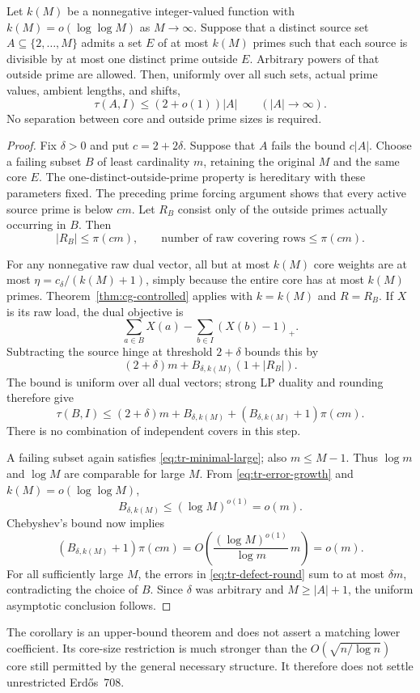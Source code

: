 \begin{corollary}
\label{cor:tr-small-core}
Let $k(M)$ be a nonnegative integer-valued function with
$k(M)=o(\log\log M)$ as $M\to\infty$. Suppose that a distinct source
set $A\subseteq\{2,\ldots,M\}$ admits a set $E$ of at most $k(M)$
primes such that each source is divisible by at most one distinct prime
outside $E$. Arbitrary powers of that outside prime are allowed.
Then, uniformly over all such sets, actual prime values, ambient lengths,
and shifts,
\[
 \tau(A,I)\le(2+o(1))|A|\qquad(|A|\to\infty).
\]
No separation between core and outside prime sizes is required.
\end{corollary}

\begin{proof}
Fix $\delta>0$ and put $c=2+2\delta$. Suppose that $A$ fails the bound
$c|A|$. Choose a failing subset $B$ of least cardinality $m$, retaining
the original $M$ and the same core $E$. The one-distinct-outside-prime
property is hereditary with these parameters fixed. The preceding prime
forcing argument shows that every active source prime is below $cm$.
Let $R_B$ consist only of the outside primes actually occurring in $B$.
Then
\begin{equation}
 |R_B|\le\pi(cm),
 \qquad\text{number of raw covering rows}\le\pi(cm).
 \label{eq:tr-active-counts}
\end{equation}

For any nonnegative raw dual vector, all but at most $k(M)$ core weights
are at most $\eta=c_\delta/(k(M)+1)$, simply because the entire core has
at most $k(M)$ primes. Theorem~\ref{thm:cg-controlled} applies with
$k=k(M)$ and $R=R_B$. If $X$ is its raw load, the dual objective is
\[
 \sum_{a\in B}X(a)-\sum_{b\in I}(X(b)-1)_+.
\]
Subtracting the source hinge at threshold $2+\delta$ bounds this by
\[
 (2+\delta)m+B_{\delta,k(M)}(1+|R_B|).
\]
The bound is uniform over all dual vectors; strong LP duality and rounding
therefore give
\begin{equation}
 \tau(B,I)\le(2+\delta)m+B_{\delta,k(M)}
       +(B_{\delta,k(M)}+1)\pi(cm).
 \label{eq:tr-defect-round}
\end{equation}
There is no combination of independent covers in this step.

A failing subset again satisfies \eqref{eq:tr-minimal-large}; also
$m\le M-1$. Thus $\log m$ and $\log M$ are comparable for large $M$.
From \eqref{eq:tr-error-growth} and $k(M)=o(\log\log M)$,
\[
 B_{\delta,k(M)}\le(\log M)^{o(1)}=o(m).
\]
Chebyshev's bound now implies
\[
 (B_{\delta,k(M)}+1)\pi(cm)
   =O\!\left(\frac{(\log M)^{o(1)}}{\log m}\,m\right)
   =o(m).
\]
For all sufficiently large $M$, the errors in
\eqref{eq:tr-defect-round} sum to at most $\delta m$, contradicting the
choice of $B$. Since $\delta$ was arbitrary and $M\ge|A|+1$, the
uniform asymptotic conclusion follows.
\end{proof}

The corollary is an upper-bound theorem and does not assert a matching
lower coefficient. Its core-size restriction is much stronger than the
$O(\sqrt{n/\log n})$ core still permitted by the general necessary
structure. It therefore does not settle unrestricted Erd\H{o}s~708.
